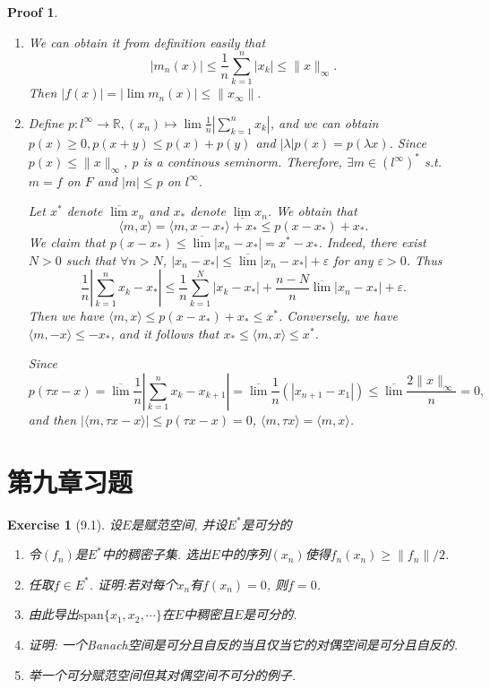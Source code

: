 \documentclass[hyperref,UTF8]{ctexart}
\newtheorem{ex}{Exercise}[section]
\newtheorem{pf}{Proof}[section]
\begin{document}
\begin{pf}
    \begin{enumerate}
        \item We can obtain it from definition easily that 
        \[ |m_n(x)| \leq \frac1n\sum_{k=1}^n |x_k|\leq \|x\|_\infty. \]
        Then $|f(x)| = |\lim m_n(x)|\leq \|x_\infty\|.$
        \item Define $p: l^\infty\to \mathbb R, (x_n)\mapsto \lim \frac1n|\sum_{k = 1}^nx_k|$, and we can obtain $p(x) \geq 0, p(x + y)\leq p(x) + p(y)$ and $|\lambda|p(x) = p(\lambda x)$. Since $p(x) \leq \|x\|_\infty$, $p$ is a continous seminorm. Therefore, $\exists m\in (l^\infty)^*$ s.t. $m = f$ on $F$ and $|m|\leq p$ on $l^\infty$. 
        
        Let $x^*$ denote $\overline\lim x_n$ and $x_*$ denote $\underline \lim x_n$. We obtain that 
        \[ \langle m, x\rangle  = \langle m, x-x_*\rangle + x_* \leq p(x-x_*) + x_*.\]
        We claim that $p(x-x_*)\leq \overline\lim |x_n - x_*| = x^*-x_*$. Indeed, there exist $N>0$ such that $\forall n > N$, $|x_n - x_*| \leq \overline\lim |x_n - x_*| + \varepsilon$ for any $\varepsilon>0$. Thus 
        \[ \frac1n|\sum_{k=1}^n x_k - x_*|\leq \frac1n \sum_{k=1}^N |x_k - x_*| + \frac{n-N}{n}\overline\lim|x_n - x_*| + \varepsilon. \]
        Then we have $\langle m, x\rangle \leq p(x-x_*) + x_*\leq x^*$. Conversely, we have $\langle m, -x\rangle \leq -x_*$, and it follows that $x_*\leq \langle m, x\rangle \leq x^*$.

        Since
        \[ p(\tau x - x) = \overline\lim \frac1n |\sum_{k = 1}^nx_k - x_{k+1}| = \overline\lim\frac1n(|x_{n+1}-x_1|)\leq \overline\lim \frac{2\|x\|_\infty}{n} = 0, \]
        and then $|\langle m, \tau x - x\rangle|\leq p(\tau x - x) = 0$, $\langle m, \tau x\rangle = \langle m, x\rangle$. 
    \end{enumerate}
\end{pf}

\section{第九章习题}

\begin{ex}[9.1]
    设$E$是赋范空间, 并设$E^*$是可分的
    \begin{enumerate}
        \item 令$(f_n)$是$E^*$中的稠密子集. 选出$E$中的序列$(x_n)$使得$f_n(x_n)\geq \|f_n\|/2$.
        \item 任取$f\in E^*$. 证明:若对每个$x_n$有$f(x_n)=0$, 则$f=0$.
        \item 由此导出$\text{span}\{x_1, x_2, \cdots\}$在$E$中稠密且$E$是可分的. 
        \item 证明: 一个Banach空间是可分且自反的当且仅当它的对偶空间是可分且自反的. 
        \item 举一个可分赋范空间但其对偶空间不可分的例子.
    \end{enumerate}
\end{ex}
\end{document}
